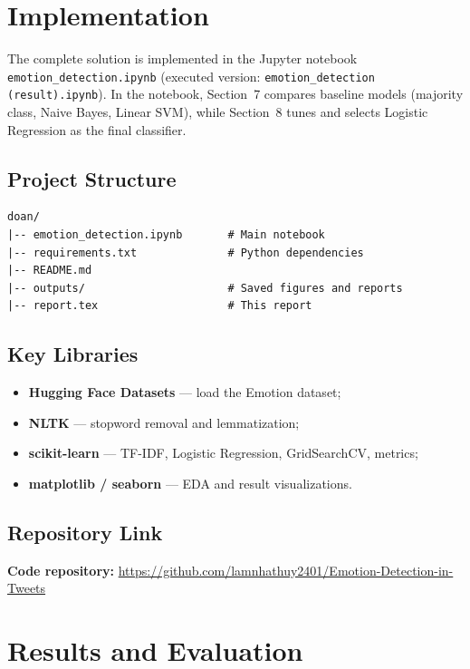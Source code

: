 \documentclass[12pt]{article}
\begin{document}
\section{Implementation}

The complete solution is implemented in the Jupyter notebook \texttt{emotion\_detection.ipynb} (executed version: \texttt{emotion\_detection (result).ipynb}).
In the notebook, Section~7 compares baseline models (majority class, Naive Bayes, Linear SVM), while Section~8 tunes and selects Logistic Regression as the final classifier.

\subsection{Project Structure}

\begin{verbatim}
doan/
|-- emotion_detection.ipynb       # Main notebook
|-- requirements.txt              # Python dependencies
|-- README.md
|-- outputs/                      # Saved figures and reports
|-- report.tex                    # This report
\end{verbatim}

\subsection{Key Libraries}

\begin{itemize}
    \item \textbf{Hugging Face Datasets} --- load the Emotion dataset;
    \item \textbf{NLTK} --- stopword removal and lemmatization;
    \item \textbf{scikit-learn} --- TF-IDF, Logistic Regression, GridSearchCV, metrics;
    \item \textbf{matplotlib / seaborn} --- EDA and result visualizations.
\end{itemize}

\subsection{Repository Link}

\textbf{Code repository:} \url{https://github.com/lamnhathuy2401/Emotion-Detection-in-Tweets}

\section{Results and Evaluation}
\end{document}
